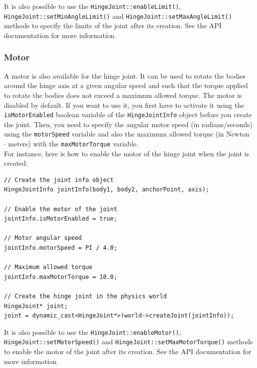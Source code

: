 \documentclass[a4paper,12pt]{article}
\begin{document}
     \vspace{0.6cm}

     \begin{sloppypar}
        It is also possible to use the \texttt{HingeJoint::enableLimit()}, \texttt{HingeJoint::setMinAngleLimit()} and \texttt{HingeJoint::setMaxAngleLimit()} methods to specify
        the limits of the joint after its creation. See the API documentation for more information.
     \end{sloppypar}

     \subsubsection{Motor}

     A motor is also available for the hinge joint. It can be used to rotate the bodies around the hinge axis at a given angular speed and such that the torque applied to
     rotate the bodies does not exceed a maximum allowed torque. The motor is disabled by default. If you want to use it, you first have to activate it using the
     \texttt{isMotorEnabled} boolean variable of the \texttt{HingeJointInfo} object before you create the joint. Then, you need to specify the angular motor speed (in radians/seconds)
     using the \texttt{motorSpeed} variable and also the maximum allowed torque (in Newton $\cdot$ meters) with the \texttt{maxMotorTorque} variable. \\

     For instance, here is how to enable the motor of the hinge joint when the joint is created: \\

     \begin{lstlisting}
// Create the joint info object
HingeJointInfo jointInfo(body1, body2, anchorPoint, axis);

// Enable the motor of the joint
jointInfo.isMotorEnabled = true;

// Motor angular speed
jointInfo.motorSpeed = PI / 4.0;

// Maximum allowed torque
jointInfo.maxMotorTorque = 10.0;

// Create the hinge joint in the physics world
HingeJoint* joint;
joint = dynamic_cast<HingeJoint*>(world->createJoint(jointInfo));
  \end{lstlisting}

     \vspace{0.6cm}

     \begin{sloppypar}
        It is also possible to use the \texttt{HingeJoint::enableMotor()}, \texttt{HingeJoint::setMotorSpeed()} and
	     \texttt{HingeJoint::setMaxMotorTorque()} methods to
        enable the motor of the joint after its creation. See the API documentation for more information.
     \end{sloppypar}
\end{document}
